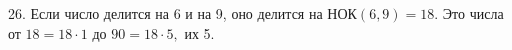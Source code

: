 26. Если число делится на 6 и на 9, оно делится на НОК$(6,9)=18.$ Это числа от $18=18\cdot1$ до $90=18\cdot5,$ их 5.\\
